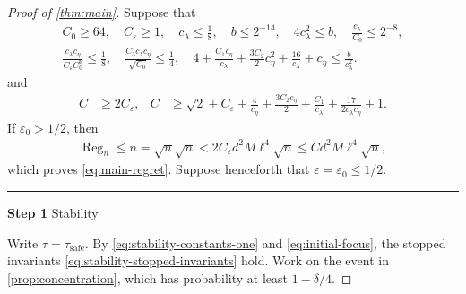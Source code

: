 \documentclass[11pt]{article}
\newcommand{\proofstep}[2]{%
    \par\medskip
    \noindent
    \textcolor{blue!55!black}{\rule{2pt}{1.2em}}%
    \hspace{0.6em}%
    {\sffamily\bfseries\color{blue!55!black}Step #1}%
    \quad
    {\sffamily #2}%
    \par\smallskip
}
\newcommand{\1}{\mathbf 1}
\newcommand{\eps}{\varepsilon}
\begin{document}
\begin{proof}[Proof of \cref{thm:main}]
    Suppose that
    \begin{align}
        C_0                    \geq64,
        \quad
        C_\eps                 \geq1,
        \quad
        c_\lambda              \leq\frac18,
        \quad
        b                      \leq2^{-14},
        \quad
        4c_\lambda^2           \leq b,
        \quad
        \frac{c_\lambda}{C_0}  \leq2^{-8},
        \label{eq:stability-constants-one}
        \\
        \frac{c_\lambda c_\eta}{C_\eps C_0^6}
        \leq\frac18,
        \quad
        \frac{C_3c_\lambda c_\eta}{\sqrt{C_0}}
        \leq\frac14,
        \quad
        4
        +\frac{C_1c_\eta}{c_\lambda}
        +\frac{3C_2}{2}c_\eta^2
        +\frac{16}{c_\lambda}
        +c_\eta
        \leq
        \frac{b}{c_\lambda^2}.
        \label{eq:stability-constants-two}
    \end{align}
    and
    \begin{align}
        C
         & \geq 2C_\eps,
         &
        C
         & \geq
        \sqrt2+C_\eps
        +\frac4{c_\eta}
        +\frac{3C_2c_\eta}{2}
        +\frac{C_1}{c_\lambda}
        +\frac{17}{2c_\lambda c_\eta}
        +1.
        \label{eq:main-constant-choice}
    \end{align}
    If $\eps_0>1/2$, then
    \begin{align}
        \operatorname{Reg}_n
        \leq n
        =\sqrt n\sqrt n
        <2C_\eps d^2M\ell^4\sqrt n
        \leq C d^2M\ell^4\sqrt n,
    \end{align}
    which proves \eqref{eq:main-regret}.  Suppose henceforth that
    $\eps=\eps_0\leq1/2$.

    \proofstep{1}{Stability}
    Write $\tau=\tau_{\mathrm{safe}}$.
    By \eqref{eq:stability-constants-one} and \eqref{eq:initial-focus},
    the stopped invariants \eqref{eq:stability-stopped-invariants} hold.
    Work on the event in \cref{prop:concentration}, which has probability at
    least $1-\delta/4$.


\end{proof}
\end{document}
